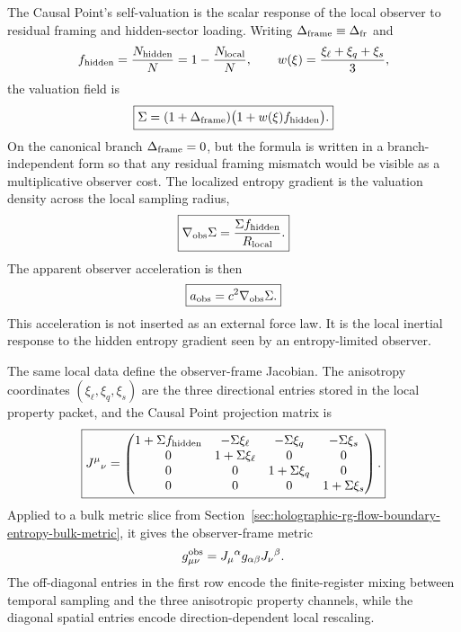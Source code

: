 \documentclass[11pt]{article}
\newcommand{\Deltafr}{\Delta_{\rm fr}}
\newcommand{\Nbits}{N}
\begin{document}
The Causal Point's self-valuation is the scalar response of the local observer
to residual framing and hidden-sector loading.  Writing
$\Delta_{\rm frame}\equiv\Deltafr$ and
\begin{equation}
\label{eq:section-seven-hidden-fraction}
 f_{\rm hidden}
 =
 \frac{N_{\rm hidden}}{\Nbits}
 =
 1-\frac{N_{\rm local}}{\Nbits},
 \qquad
 w(\xi)=\frac{\xi_{\ell}+\xi_q+\xi_s}{3},
\end{equation}
the valuation field is
\begin{equation}
\label{eq:section-seven-self-valuation}
 \boxed{
 \Sigma
 =
 (1+\Delta_{\rm frame})
 \bigl(1+w(\xi)f_{\rm hidden}\bigr).
 }
\end{equation}
On the canonical branch $\Delta_{\rm frame}=0$, but the formula is written in a
branch-independent form so that any residual framing mismatch would be visible
as a multiplicative observer cost.  The localized entropy gradient is the
valuation density across the local sampling radius,
\begin{equation}
\label{eq:section-seven-localized-entropy-gradient}
 \boxed{
 \nabla_{\rm obs}\Sigma
 =
 \frac{\Sigma f_{\rm hidden}}{R_{\rm local}}.
 }
\end{equation}
The apparent observer acceleration is then
\begin{equation}
\label{eq:section-seven-apparent-acceleration}
 \boxed{
 a_{\rm obs}
 =
 c^2\nabla_{\rm obs}\Sigma.
 }
\end{equation}
This acceleration is not inserted as an external force law.  It is the local
inertial response to the hidden entropy gradient seen by an entropy-limited
observer.

The same local data define the observer-frame Jacobian.  The anisotropy
coordinates $(\xi_{\ell},\xi_q,\xi_s)$ are the three directional entries stored
in the local property packet, and the Causal Point projection matrix is
\begin{equation}
\label{eq:section-seven-observer-jacobian}
 \boxed{
 J^{\mu}{}_{\nu}
 =
 \begin{pmatrix}
 1+\Sigma f_{\rm hidden} & -\Sigma\xi_{\ell} & -\Sigma\xi_q & -\Sigma\xi_s\\
 0 & 1+\Sigma\xi_{\ell} & 0 & 0\\
 0 & 0 & 1+\Sigma\xi_q & 0\\
 0 & 0 & 0 & 1+\Sigma\xi_s
 \end{pmatrix}.
 }
\end{equation}
Applied to a bulk metric slice from Section~\ref{sec:holographic-rg-flow-boundary-entropy-bulk-metric},
it gives the observer-frame metric
\begin{equation}
\label{eq:section-seven-observer-metric-pullback}
 g^{\rm obs}_{\mu\nu}
 =
 J_{\mu}{}^{\alpha}g_{\alpha\beta}J_{\nu}{}^{\beta}.
\end{equation}
The off-diagonal entries in the first row encode the finite-register mixing
between temporal sampling and the three anisotropic property channels, while
the diagonal spatial entries encode direction-dependent local rescaling.
\end{document}
